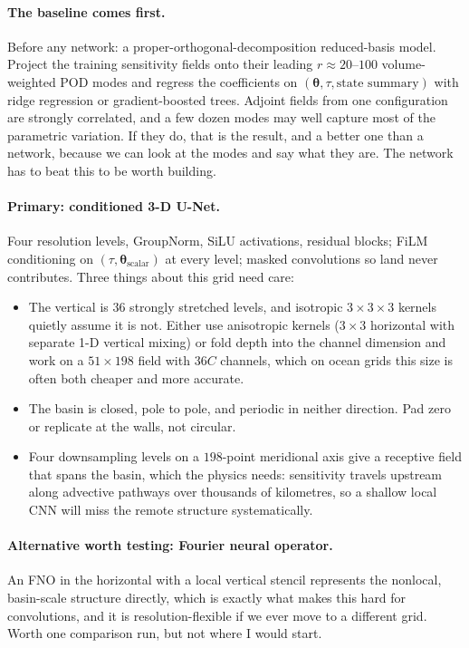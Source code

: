 \paragraph{The baseline comes first.}
Before any network: a proper-orthogonal-decomposition reduced-basis model.
Project the training sensitivity fields onto their leading $r\approx20$--$100$
volume-weighted POD modes and regress the coefficients on
$(\boldsymbol{\theta},\tau,\text{state summary})$ with ridge regression or
gradient-boosted trees. Adjoint fields from one configuration are strongly
correlated, and a few dozen modes may well capture most of the parametric
variation. If they do, that is the result, and a better one than a network,
because we can look at the modes and say what they are. The network has to beat
this to be worth building.

\paragraph{Primary: conditioned 3-D U-Net.}
Four resolution levels, GroupNorm, SiLU activations, residual blocks; FiLM
conditioning on $(\tau,\boldsymbol{\theta}_{\text{scalar}})$ at every level;
masked convolutions so land never contributes. Three things about this grid
need care:

\begin{itemize}[nosep]
  \item The vertical is $36$ strongly stretched levels, and isotropic
        $3\times3\times3$ kernels quietly assume it is not. Either use
        anisotropic kernels ($3\times3$ horizontal with separate 1-D vertical
        mixing) or fold depth into the channel dimension and work on a
        $51\times198$ field with $36C$ channels, which on ocean grids this size
        is often both cheaper and more accurate.
  \item The basin is closed, pole to pole, and periodic in neither direction.
        Pad zero or replicate at the walls, not circular.
  \item Four downsampling levels on a $198$-point meridional axis give a
        receptive field that spans the basin, which the physics needs:
        sensitivity travels upstream along advective pathways over thousands of
        kilometres, so a shallow local CNN will miss the remote structure
        systematically.
\end{itemize}

\paragraph{Alternative worth testing: Fourier neural operator.}
An FNO in the horizontal with a local vertical stencil represents the nonlocal,
basin-scale structure directly, which is exactly what makes this hard for
convolutions, and it is resolution-flexible if we ever move to a different
grid. Worth one comparison run, but not where I would start.

